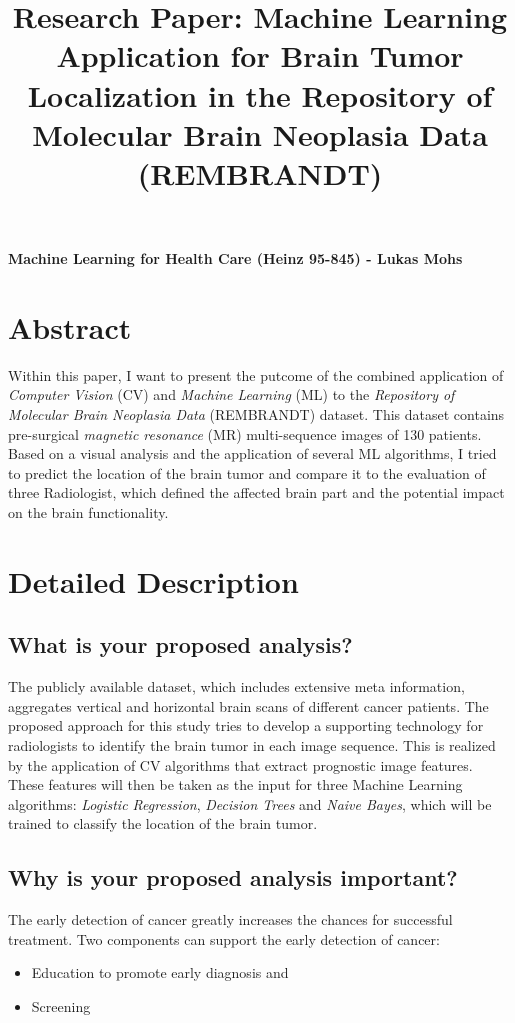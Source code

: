 \documentclass[twoside,11pt]{article}
\begin{document}
\title{Research Paper: Machine Learning Application for Brain Tumor Localization in the  Repository of Molecular Brain Neoplasia Data (REMBRANDT) }

\maketitle
\textbf{Machine Learning for Health Care (Heinz 95-845) - Lukas Mohs}


\section{Abstract}
\noindent Within this paper, I want to present the putcome of the  combined application of \textit{Computer Vision} (CV) and  \textit{Machine Learning} (ML) to the \textit{Repository of Molecular Brain Neoplasia Data } (REMBRANDT) dataset. This dataset contains pre-surgical \textit{magnetic resonance} (MR) multi-sequence images of 130 patients. Based on a visual analysis and the application of several ML algorithms, I tried to predict the location of the brain tumor and compare it to the evaluation of three Radiologist, which defined the affected brain part and the potential impact on the brain functionality.

\section{Detailed Description}
\subsection{What is your proposed analysis?}
The publicly available dataset, which includes extensive meta information, aggregates vertical and horizontal brain scans of different cancer patients. The proposed approach for this study tries to develop a supporting technology for radiologists to identify the brain tumor in each image sequence. This is realized by the application of CV algorithms that extract prognostic image features. These features will then be taken as the input for three Machine Learning algorithms: \textit{Logistic Regression}, \textit{Decision Trees} and \textit{Naive Bayes}, which will be trained to classify the location of the brain tumor.

\subsection{Why is your proposed analysis important?}
The early detection of cancer greatly increases the chances for successful treatment. Two components can support the early detection of cancer:
\begin{itemize}
	\item Education to promote early diagnosis and
	\item Screening
\end{itemize}
\citep{cite1}
\end{document}
